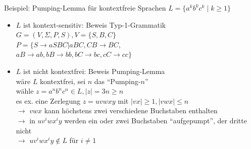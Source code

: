 \begin{frame}{Beispiel: Pumping-Lemma für kontextfreie Sprachen}
	$L=\{a^kb^kc^k \mid k \geq 1 \}$
	\begin{itemize}
		\item $L$ ist kontext-sensitiv: Beweis Typ-1-Grammatik\\
		$G=(V, \Sigma, P, S), V=\{S, B, C\}$\\
		$P=\{S\rightarrow aSBC | aBC, CB \rightarrow BC,$\\
		\qquad $aB \rightarrow ab, bB \rightarrow bb, bC \rightarrow bc, cC \rightarrow cc \}$
		\item $L$ ist nicht kontextfrei: Beweis Pumping-Lemma\\
		wäre $L$ kontextfrei, sei $n$ das "`Pumping-$n$"'\\
		wähle $z=a^nb^nc^n \in L, |z|=3n \geq n$\\
		es ex. eine Zerlegung $z=uvwxy$ mit $|vx|\geq 1, |vwx| \leq n$\\
		$\rightarrow$ $vwx$ kann höchstens zwei verschiedene Buchstaben enthalten\\
		$\rightarrow$ in $uv^iwx^iy$ werden ein oder zwei Buchstaben "`aufgepumpt"', der dritte nicht\\
		$\rightarrow$ $uv^iwx^iy \notin L$ für $i \neq 1$ \Lightning 
	\end{itemize}
\end{frame}

